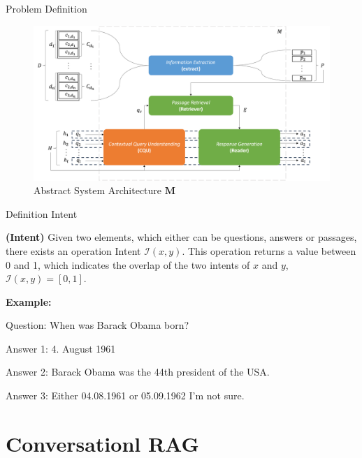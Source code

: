 \documentclass{beamer}
\begin{document}
\begin{frame}{Problem Definition}

  \begin{figure}
    \includegraphics[width=\textwidth]{Grafiken/conrag_konzeptionell.png}
    \caption{Abstract System Architecture $\mathbf{M}$}
  \end{figure}
  
\end{frame}

\begin{frame}{Definition Intent}
  
  \begin{definition}
    \textbf{(Intent)} Given two elements, which either can be questions, answers or passages, there exists an operation Intent $\mathcal{I}(x, y)$. This operation returns a value between 0 and 1, which indicates the overlap of the two intents of $x$ and $y$, $\mathcal{I}(x, y) = [0,1]$.
    \label{def:intent}
  \end{definition}

  \bigskip
  \textbf{Example:}
  \begin{flushleft}
    Question: When was Barack Obama born?
  \end{flushleft}
  \begin{flushleft}
    Answer 1: 4. August 1961

    Answer 2: Barack Obama was the 44th president of the USA.
    
    Answer 3: Either 04.08.1961 or 05.09.1962 I'm not sure. 
  \end{flushleft}

\end{frame}

\section[ConRAG]{Conversationl RAG}
\end{document}
